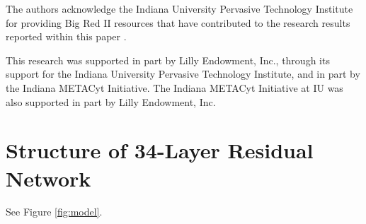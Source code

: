 \begin{acks}

The authors acknowledge the Indiana University Pervasive Technology Institute for providing Big Red II resources that have contributed to the research results reported within this paper \cite{PTI}.

This research was supported in part by Lilly Endowment, Inc., through its support for the Indiana University Pervasive Technology Institute, and in part by the Indiana METACyt Initiative. The Indiana METACyt Initiative at IU was also supported in part by Lilly Endowment, Inc.

\end{acks}

\newpage
\appendix
\section{Structure of 34-Layer Residual Network} \label{app-ResNet}

See Figure \ref{fig:model}.


